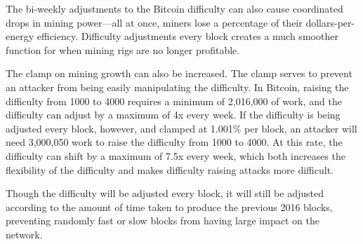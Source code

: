 \documentclass[twocolumn]{article}
\begin{document}
The bi-weekly adjustments to the Bitcoin difficulty can also cause coordinated drops in mining power---all at once, miners lose a percentage of their dollars-per-energy efficiency.
Difficulty adjustments every block creates a much smoother function for when mining rigs are no longer profitable.

The clamp on mining growth can also be increased.
The clamp serves to prevent an attacker from being easily manipulating the difficulty.
In Bitcoin, raising the difficulty from 1000 to 4000 requires a minimum of 2,016,000 of work, and the difficulty can adjust by a maximum of 4x every week.
If the difficulty is being adjusted every block, however, and clamped at 1.001\% per block, an attacker will need 3,000,050 work to raise the difficulty from 1000 to 4000.
At this rate, the difficulty can shift by a maximum of 7.5x every week, which both increases the flexibility of the difficulty and makes difficulty raising attacks more difficult.

Though the difficulty will be adjusted every block, it will still be adjusted according to the amount of time taken to produce the previous 2016 blocks, preventing randomly fast or slow blocks from having large impact on the network.



\end{document}
